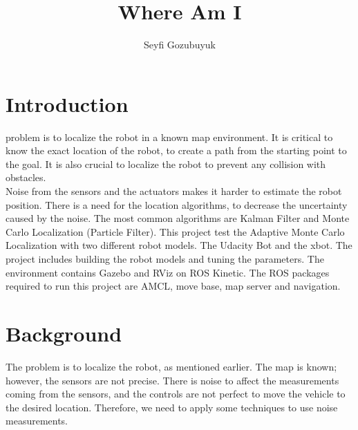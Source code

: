 \documentclass[10pt,journal,compsoc]{IEEEtran}
\begin{document}
\title{Where Am I}

\author{Seyfi Gozubuyuk}

%
{}


\maketitle
\IEEEdisplaynontitleabstractindextext
\IEEEpeerreviewmaketitle
\section{Introduction}
\label{sec:introduction}

 problem is to localize the robot in a known map environment. It is critical to know the exact location of the robot, to create a path from the starting point to the goal. It is also crucial to localize the robot to prevent any collision with obstacles.\\
Noise from the sensors and the actuators makes it harder to estimate the robot position. There is a need for the location algorithms, to decrease the uncertainty caused by the noise. The most common algorithms are Kalman Filter and Monte Carlo Localization (Particle Filter). This project test the Adaptive Monte Carlo Localization with two different robot models. The Udacity Bot and the xbot. The project includes building the robot models and tuning the parameters. The environment contains Gazebo and RViz on ROS Kinetic. The ROS packages required to run this project are AMCL, move base, map server and navigation.


\section{Background}
The problem is to localize the robot, as mentioned earlier. The map is known; however, the sensors are not precise. There is noise to affect the measurements coming from the sensors, and the controls are not perfect to move the vehicle to the desired location. Therefore, we need to apply some techniques to use noise measurements.
\end{document}
